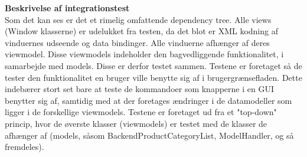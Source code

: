 \textbf{Beskrivelse af integrationstest}\\
Som det kan ses er det et rimelig omfattende dependency tree. Alle views (Window klasserne) er udelukket fra testen, da det blot er XML kodning af vinduernes udseende og data bindinger. Alle vinduerne afhænger af deres viewmodel. Disse viewmodels indeholder den bagvedliggende funktionalitet, i samarbejde med models. Disse er derfor testet sammen. Testene er foretaget så de tester den funktionalitet en bruger ville benytte sig af i brugergrænsefladen. Dette indebærer stort set bare at teste de kommandoer som knapperne i en GUI benytter sig af, samtidig med at der foretages ændringer i de datamodeller som ligger i de forskellige viewmodels. Testene er foretaget ud fra et "top-down" princip, hvor de øverste klasser (viewmodels) er testet med de klasser de afhænger af (models, såsom BackendProductCategoryList, ModelHandler, og så fremdeles).